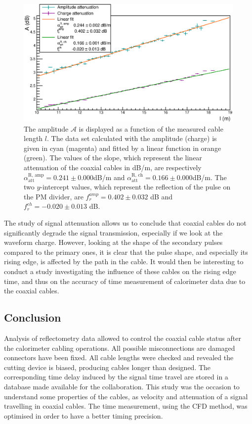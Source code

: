 \begin{figure}[h!]
  \centering
  \includegraphics[width=15cm]{commissioning/fig_commissioning/attenuation_length.eps}
  \caption{The amplitude $\mathcal{A}$ is displayed as a function of the measured cable length $l$.
    The data set calculated with the amplitude (charge) is given in cyan (magenta) and fitted by a linear function in orange (green).
    The values of the slope, which represent the linear attenuation of the coaxial cables in dB/m, are respectively $\alpha_{\text{att}}^{\text{R, amp}} = 0.241\pm 0.000$dB/m and $\alpha_{\text{att}}^{\text{R, ch}} = 0.166\pm0.000$dB/m.
    The two $y$-intercept values, which represent the reflection of the pulse on the PM divider, are $f_{r}^{amp} = 0.402\pm 0.032$ dB and $f_{r}^{ch} = -0.020\pm 0.013$ dB.
    \label{fig:attenuation}}
\end{figure}

The study of signal attenuation allows us to conclude that coaxial cables do not significantly degrade the signal transmission, especially if we look at the waveform charge.
However, looking at the shape of the secondary pulses compared to the primary ones, it is clear that the pulse shape, and especially its rising edge, is affected by the path in the cable.
It would then be interesting to conduct a study investigating the influence of these cables on the rising edge time, and thus on the accuracy of time measurement of calorimeter data due to the coaxial cables.

\subsection{Conclusion}

Analysis of reflectometry data allowed to control the coaxial cable status after the calorimeter cabling operations.
All possible misconnections are damaged connectors have been fixed.
All cable lengths were checked and revealed the cutting device is biased, producing cables longer than designed.
The corresponding time delay induced by the signal time travel are stored in a database made available for the collaboration.
This study was the occasion to understand some properties of the cables, as velocity and attenuation of a signal travelling in coaxial cables.
The time measurement, using the CFD method, was optimised in order to have a better timing precision.


